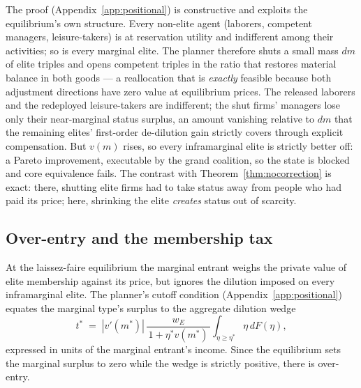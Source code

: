 \documentclass[12pt,letterpaper]{article}
\theoremstyle{definition}
\begin{document}
The proof (Appendix~\ref{app:positional}) is constructive and exploits the equilibrium's own structure.
Every non-elite agent (laborers, competent managers, leisure-takers) is at reservation utility and indifferent among their activities; so is every marginal elite.
The planner therefore shuts a small mass $dm$ of elite triples and opens competent triples in the ratio that restores material balance in both goods --- a reallocation that is \emph{exactly} feasible because both adjustment directions have zero value at equilibrium prices.
The released laborers and the redeployed leisure-takers are indifferent; the shut firms' managers lose only their near-marginal status surplus, an amount vanishing relative to $dm$ that the remaining elites' first-order de-dilution gain strictly covers through explicit compensation.
But $v(m)$ rises, so every inframarginal elite is strictly better off: a Pareto improvement, executable by the grand coalition, so the state is blocked and core equivalence fails.
The contrast with Theorem~\ref{thm:nocorrection} is exact: there, shutting elite firms had to take status away from people who had paid its price; here, shrinking the elite \emph{creates} status out of scarcity.

\subsection{Over-entry and the membership tax}

At the laissez-faire equilibrium the marginal entrant weighs the private value of elite membership against its price, but ignores the dilution imposed on every inframarginal elite.
The planner's cutoff condition (Appendix~\ref{app:positional}) equates the marginal type's surplus to the aggregate dilution wedge
\begin{equation}\label{eq:wedge}
  t^\ast \;=\; \left|v'(m^\ast)\right|\, \frac{w_E}{\,1+\eta^\ast v(m^\ast)\,}
  \int_{\eta\geq\eta^\ast}\!\! \eta\, dF(\eta),
\end{equation}
expressed in units of the marginal entrant's income.
Since the equilibrium sets the marginal surplus to zero while the wedge is strictly positive, there is over-entry.
\end{document}
